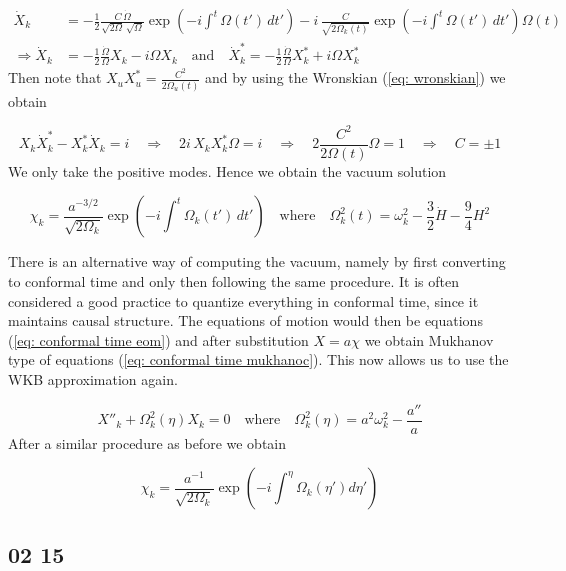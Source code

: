 \begin{align*}
\dot{X}_k
&= -\frac{1}{2}\frac{C\,\dot{\Omega}}{\sqrt{2\Omega}\,\sqrt{\Omega}} \exp\!\left(-i\int^{t}\Omega(t')\,dt'\right)
- i\,\frac{C}{\sqrt{2\Omega_k(t)}} \exp\!\left(-i\int^{t}\Omega(t')\,dt'\right)\Omega(t) \\[6pt]
\Rightarrow  \dot{X}_k &= -\frac{1}{2}\frac{\dot{\Omega}}{\Omega}X_k - i\Omega X_k
\quad \text{and} \quad
\dot{X}_k^{*} = -\frac{1}{2}\frac{\dot{\Omega}}{\Omega}X_k^{*} + i\Omega X_k^{*}
\end{align*}
Then note that $X_u X_u^{*} = \frac{C^2}{2\Omega_u(t)}$ and by using the Wronskian (\ref{eq: wronskian}) we obtain

\begin{equation*}
    X_k \dot{X}_k^{*} - X_k^{*} \dot{X}_k = i \quad \Rightarrow \quad 2i\, X_k X_k^{*} \Omega = i \quad \Rightarrow \quad 2 \frac{C^2}{2\Omega(t)} \Omega = 1 \quad \Rightarrow \quad C = \pm 1
\end{equation*}
We only take the positive modes. Hence we obtain the vacuum solution

\begin{equation*}
    \chi_k = \frac{a^{-3/2}}{\sqrt{2\Omega_k}} \exp\left(-i \int^{t} \Omega_k(t')\, dt' \right) \quad \text{where} \quad \Omega^2_k(t) = \omega^2_k - \frac{3}{2} \dot{H} - \frac{9}{4} H^2
\end{equation*}

There is an alternative way of computing the vacuum, namely by first converting to conformal time and only then following the same procedure. It is often considered a good practice to quantize everything in conformal time, since it maintains causal structure. The equations of motion would then be equations (\ref{eq: conformal time eom}) and after substitution $X = a \chi$ we obtain Mukhanov type of equations (\ref{eq: conformal time mukhanoc}). This now allows us to use the WKB approximation again. 

\begin{equation*}
    X''_k + \Omega^2_k(\eta) X_k = 0 \quad \text{where} \quad \Omega^2_k(\eta) = a^2 \omega^2_k - \frac{a''}{a}
\end{equation*}
After a similar procedure as before we obtain

\begin{equation*}
    \chi_k = \frac{a^{-1}}{\sqrt{2 \Omega_k}} \exp(-i \int^\eta \Omega_k(\eta')d \eta')
\end{equation*}


\subsection*{02 15}

